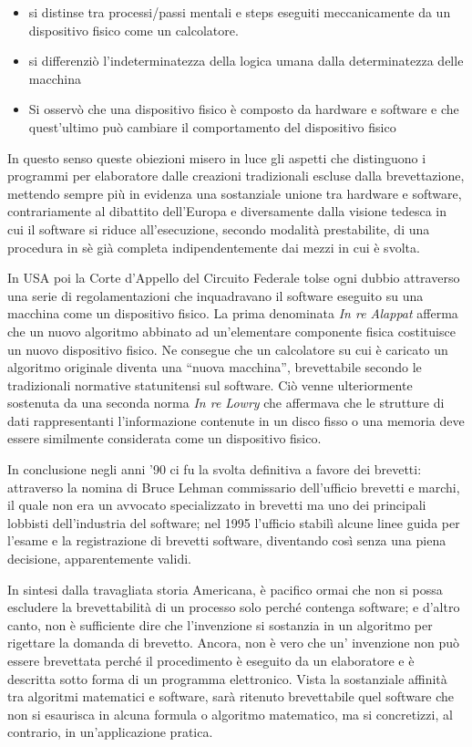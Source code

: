 \begin{itemize}
	\item si distinse tra processi/passi mentali e steps eseguiti meccanicamente da un dispositivo fisico come un calcolatore.
	\item si differenziò l'indeterminatezza della logica umana dalla determinatezza delle macchina
	\item Si osservò che una dispositivo fisico è composto da hardware e software e che quest'ultimo può cambiare il comportamento del dispositivo fisico
\end{itemize}
In questo senso queste obiezioni misero in luce gli aspetti che distinguono i programmi per elaboratore dalle creazioni tradizionali escluse dalla brevettazione, mettendo sempre più in evidenza una sostanziale unione tra hardware e software, contrariamente al dibattito dell'Europa e  diversamente dalla visione tedesca in cui il software si riduce all'esecuzione, secondo modalità prestabilite, di una procedura in sè già completa indipendentemente dai mezzi in cui è svolta.

In USA poi la Corte d'Appello del Circuito Federale tolse ogni dubbio attraverso una serie di regolamentazioni che inquadravano il software eseguito su una macchina come un dispositivo fisico. La prima denominata \textit{In re Alappat} afferma che un nuovo algoritmo abbinato ad un'elementare componente fisica costituisce un nuovo dispositivo fisico. Ne consegue che un calcolatore su cui è caricato un algoritmo originale diventa una ``nuova macchina'', brevettabile secondo le tradizionali normative statunitensi sul software. Ciò venne ulteriormente sostenuta da una seconda norma \textit{In re Lowry} che affermava che le strutture di dati rappresentanti l'informazione contenute in un disco fisso o una memoria deve essere similmente considerata come un dispositivo fisico.

In conclusione negli anni '90 ci fu la svolta definitiva a favore dei brevetti: attraverso la nomina di Bruce Lehman commissario dell'ufficio brevetti e marchi, il quale non era un avvocato specializzato in brevetti ma uno dei principali lobbisti dell'industria del software; nel 1995 l'ufficio stabilì alcune linee guida per l'esame e la registrazione di brevetti software, diventando così senza una piena decisione, apparentemente validi.

In sintesi dalla travagliata storia Americana, è pacifico ormai che non si possa escludere la brevettabilità di un processo solo perché contenga software; e d'altro canto, non è sufficiente dire che l'invenzione si sostanzia in un algoritmo per rigettare la domanda di brevetto. Ancora, non è vero che un' invenzione non può essere brevettata perché il procedimento è eseguito da un elaboratore e è descritta sotto forma di un programma elettronico. Vista la sostanziale affinità tra algoritmi matematici e software, sarà ritenuto brevettabile quel software che non si esaurisca in alcuna formula o algoritmo matematico, ma si concretizzi, al contrario, in un'applicazione pratica.

